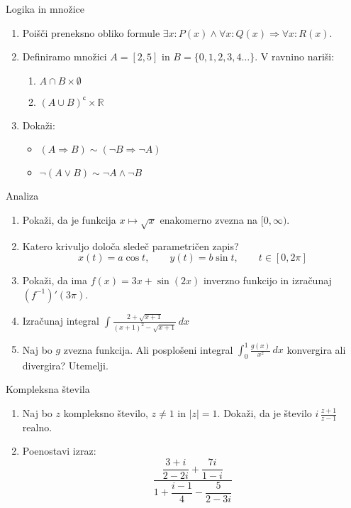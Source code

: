 \begin{frame}{Logika in množice}
	\begin{enumerate}
		\item
		Poišči preneksno obliko formule 
		$
		\exists{x}:P(x) \land \forall{x}:Q(x) \Rightarrow{\forall{x}:R(x)}
		$.
		\item 
		Definiramo množici $A=[2,5]$ in $B=\{
			0,1,2,3,4\dots\}
		$.
		V ravnino nariši:
		\begin{enumerate}
		   \item $A \cap B \times \emptyset$
		   \item ${(A \cup B)}^{\mathsf{c}} \times \mathbb{R}$
		\end{enumerate}
		\item
		Dokaži:
		\begin{itemize}
			\item $(A \Rightarrow B) \sim (\neg B \Rightarrow \neg A)$
			\item $\neg (A \lor B) \sim \neg A \land \neg B$
		\end{itemize}
	\end{enumerate}
\end{frame}

\begin{frame}{Analiza}
	\begin{enumerate}
		\item
		Pokaži, da je funkcija $x \mapsto \sqrt{x}$ enakomerno zvezna na $[0, \infty)$.
		\item 
		Katero krivuljo določa sledeč parametričen zapis?
		$$
		   x(t) = a \cos t, \qquad %
		   y(t) = b \sin t, \qquad %
		   t \in [0, 2 \pi]
		$$ 
		\item
		Pokaži, da ima $f(x)=3x+ \sin (2x)$ inverzno funkcijo in izračunaj $(f^{-1})'(3 \pi)$.
		
		\item
		Izračunaj integral 
		$\displaystyle \int
		\frac{2+\sqrt{x+1}}{(x+1)^2-\sqrt{x+1}} \,dx
		$
		\item 
		Naj bo $g$ zvezna funkcija. Ali posplošeni integral 
		$\int_{0}^{1} \frac{g(x)}{x^2} \,dx$
		konvergira ali divergira? Utemelji.
	\end{enumerate}
\end{frame}

\begin{frame}{Kompleksna števila}
	\begin{enumerate}
		\item
		Naj bo $z$ kompleksno število, $z \ne 1$ in $|z|=1$.
		Dokaži, da je število \( i \, \frac{z+1}{z-1} \) realno.
		\item
		Poenostavi izraz:
		$$ \frac{\dfrac{3+i}{2-2i}+ \dfrac{7i}{1-i}}{1+\dfrac{i-1}{4}-\dfrac{5}{2-3i}}$$
	\end{enumerate}
\end{frame}